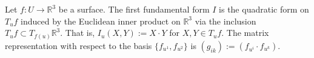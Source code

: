 Let $f: U \to \mathbb{R}^3$ be a surface. The first fundamental form $I$ is the quadratic form on $T_u f$ induced by the Euclidean inner product on $\mathbb{R}^3$ via the inclusion $T_u f \subset T_{f(u)}\mathbb{R}^3$. That is, $I_u(X, Y) := X \cdot Y$ for $X, Y \in T_u f$. The matrix representation with respect to the basis $\{f_{u^1}, f_{u^2}\}$ is $(g_{ik}) := (f_{u^i} \cdot f_{u^k})$.